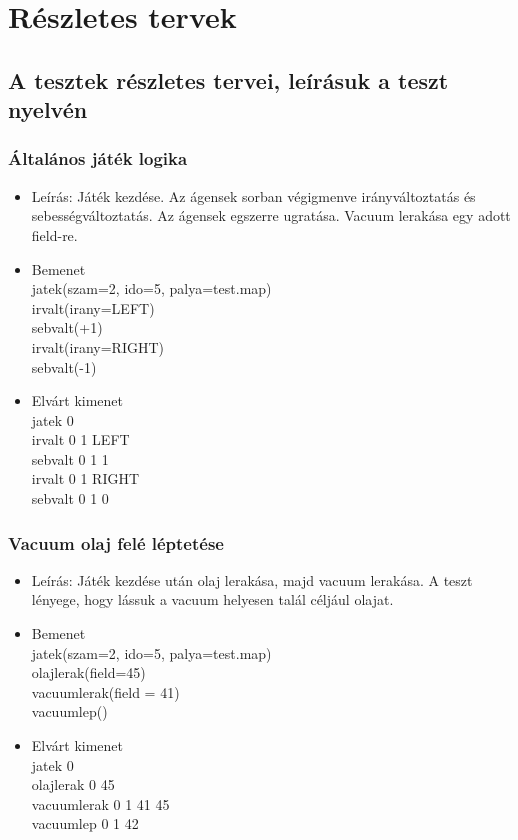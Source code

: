 %
\chapter{Részletes tervek}

\thispagestyle{fancy}



\section{A tesztek részletes tervei, leírásuk a teszt nyelvén}

\subsection{Általános játék logika}
\begin{itemize}
	\item Leírás: Játék kezdése. Az ágensek sorban végigmenve irányváltoztatás és sebességváltoztatás. Az ágensek egszerre ugratása. Vacuum lerakása egy adott field-re.
	\item Bemenet\\
		jatek(szam=2, ido=5, palya=test.map) \\
		irvalt(irany=LEFT) \\
		sebvalt(+1) \\
		irvalt(irany=RIGHT) \\
		sebvalt(-1) \\
	\item Elvárt kimenet\\
		jatek 0 \\ 
		irvalt 0 1 LEFT \\ 
		sebvalt 0 1 1 \\ 
		irvalt 0 1 RIGHT \\ 
		sebvalt 0 1 0	\\ 
\end{itemize}

\subsection{Vacuum olaj felé léptetése}
\begin{itemize}
	\item Leírás: Játék kezdése után olaj lerakása, majd vacuum lerakása. A teszt lényege, hogy lássuk a vacuum helyesen talál céljául olajat.
	\item Bemenet\\
		jatek(szam=2, ido=5, palya=test.map) \\
		olajlerak(field=45) \\
		vacuumlerak(field = 41) \\
		vacuumlep() \\
	\item Elvárt kimenet\\
		jatek 0 \\
		olajlerak 0 45 \\
		vacuumlerak 0 1 41 45 \\
		vacuumlep 0 1 42 \\ 
\end{itemize}

